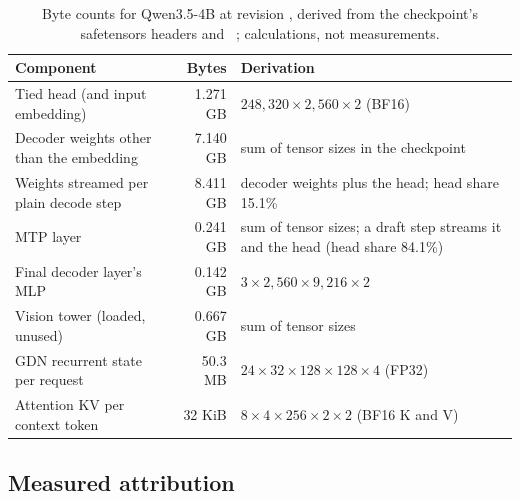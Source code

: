 \begin{table}[htbp]
\tablefont\centering
\caption{Byte counts for Qwen3.5-4B at revision \modelpin, derived from the checkpoint's safetensors headers and ~\cite{qwenconfig}; calculations, not measurements.}
\label{tab:bytes}
\vskip 0.05in
\begin{tabularx}{\linewidth}{@{}lrY@{}}\toprule
Component & Bytes & Derivation\\\midrule
Tied head (and input embedding) & 1.271 GB & $248{,}320\times2{,}560\times2$ (BF16)\\
Decoder weights other than the embedding & 7.140 GB & sum of tensor sizes in the checkpoint\\
Weights streamed per plain decode step & 8.411 GB & decoder weights plus the head; head share 15.1\%\\
MTP layer & 0.241 GB & sum of tensor sizes; a draft step streams it and the head (head share 84.1\%)\\
Final decoder layer's MLP & 0.142 GB & $3\times2{,}560\times9{,}216\times2$\\
Vision tower (loaded, unused) & 0.667 GB & sum of tensor sizes\\
GDN recurrent state per request & 50.3 MB & $24\times32\times128\times128\times4$ (FP32)\\
Attention KV per context token & 32 KiB & $8\times4\times256\times2\times2$ (BF16 K and V)\\\bottomrule
\end{tabularx}
\end{table}

\subsection{Measured attribution}\label{app:profile}\label{sec:time-measured}\label{sec:time-method}\label{sec:time-head}\label{sec:time-state}

